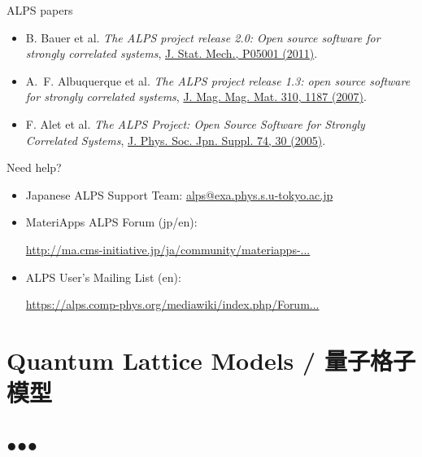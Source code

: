 \begin{frame}[t,fragile]{ALPS papers}
  \begin{itemize}
    \setlength{\itemsep}{1em}
  \item B. Bauer et al. {\it The ALPS project release 2.0: Open source software for strongly correlated systems}, \href{http://iopscience.iop.org/1742-5468/2011/05/P05001}{J. Stat. Mech., P05001 (2011)}.
  \item A.~F. Albuquerque et al. {\it The ALPS project release 1.3: open source software for strongly correlated systems}, \href{http://dx.doi.org/10.1016/j.jmmm.2006.10.304}{J. Mag. Mag. Mat. 310, 1187 (2007)}.
  \item F. Alet et al. {\it The ALPS Project: Open Source Software for
      Strongly Correlated Systems}, \href{http://jpsj.ipap.jp/link?JPSJS/74S/30}{J. Phys. Soc. Jpn. Suppl. 74, 30 (2005)}.
  \end{itemize}
\end{frame}

\begin{frame}[t,fragile]{Need help?}
  \begin{itemize}
    \setlength{\itemsep}{1em}
  \item Japanese ALPS Support Team: {\footnotesize \href{mailto:alps@exa.phys.s.u-tokyo.ac.jp}{alps@exa.phys.s.u-tokyo.ac.jp}}
  \item MateriApps ALPS Forum (jp/en):

    {\footnotesize \href{http://ma.cms-initiative.jp/ja/community/materiapps-messageboard/alps}{http://ma.cms-initiative.jp/ja/community/materiapps-...}}
  \item ALPS User's Mailing List (en):

    {\footnotesize \href{https://alps.comp-phys.org/mediawiki/index.php/Forum:Overview}{https://alps.comp-phys.org/mediawiki/index.php/Forum...}}
  \end{itemize}
\end{frame}

\section{Quantum Lattice Models / 量子格子模型}
\subsection*{{\protect\color{red}●}{\protect\color{blue}●}{\protect\color{green}●}}

